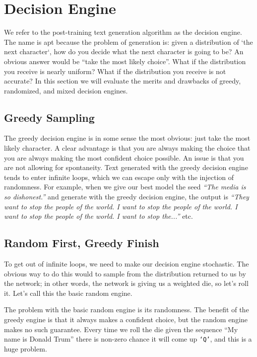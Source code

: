 \documentclass{article}
\begin{document}
\section{Decision Engine}

We refer to the post-training text generation algorithm as the decision engine. The name is apt because the problem of generation is: given a distribution of `the next character`, how do you decide what the next character is going to be? An obvious answer would be ``take the most likely choice''. What if the distribution you receive is nearly uniform? What if the distribution you receive is not accurate? In this section we will evaluate the merits and drawbacks of greedy, randomized, and mixed decision engines.

\subsection{Greedy Sampling}
The greedy decision engine is in some sense the most obvious: just take the most likely character. A clear advantage is that you are always making the choice that you are always making the most confident choice possible. An issue is that you are not allowing for spontaneity. Text generated with the greedy decision engine tends to enter infinite loops, which we can escape only with the injection of randomness. For example, when we give our best model the seed \textit{``The media is so dishonest.''} and generate with the greedy decision engine, the output is \textit{``They want to stop the people of the world. I want to stop the people of the world. I want to stop the people of the world. I want to stop the...''} etc.

\subsection{Random First, Greedy Finish}
To get out of infinite loops, we need to make our decision engine stochastic. The obvious way to do this would to sample from the distribution returned to us by the network; in other words, the network is giving us a weighted die, so let's roll it. Let's call this the basic random engine.

The problem with the basic random engine is its randomness. The benefit of the greedy engine is that it always makes a confident choice, but the random engine makes no such guarantee. Every time we roll the die given the sequence ``My name is Donald Trum'' there is non-zero chance it will come up \texttt{`Q'}, and this is a huge problem.
\end{document}
